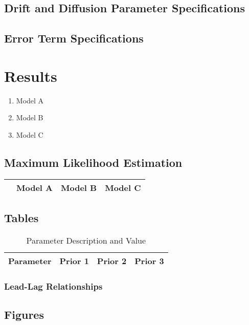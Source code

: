 \subsection{Drift and Diffusion Parameter Specifications}

\subsection{Error Term Specifications}

\section{Results}

\begin{enumerate}
	\item Model A
	\item Model B
	\item Model C
\end{enumerate}

\subsection{Maximum Likelihood Estimation}

\begin{table}[H]
	\centering
	\small
	\begin{tabular}{rrrr}
		\hline
		& Model A & Model B & Model C \\ 
		\hline
		\hline
	\end{tabular}
\end{table}

\subsection{Tables}

\begin{table}[h]\footnotesize
	\small
	\caption{Parameter Description and Value}
	\begin{tabular}{rp{2cm}p{2cm}p{2cm}}
\hline
Parameter & Prior 1 & Prior 2 & Prior 3 \\
\hline
\hline
\end{tabular}	
\end{table}

\subsubsection{Lead-Lag Relationships}


\subsection{Figures}

